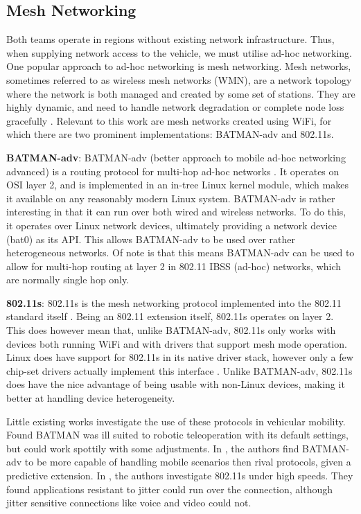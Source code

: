 \documentclass[journal]{IEEEtran}
\begin{document}
\subsection{Mesh Networking}
Both teams operate in regions without existing network infrastructure. Thus, when supplying network access to the vehicle, we must utilise ad-hoc networking. One popular approach to ad-hoc networking is mesh networking.
Mesh networks, sometimes referred to as wireless mesh networks (WMN), are a network topology where the network is both managed and created by some set of stations. They are
highly dynamic, and need to handle network degradation or complete node loss gracefully \cite{1509968}. Relevant to this work are mesh networks created using WiFi, for
which there are two prominent implementations: BATMAN-adv and 802.11s.

\textbf{BATMAN-adv}: BATMAN-adv (better approach to mobile ad-hoc networking advanced) is a routing protocol for multi-hop ad-hoc networks \cite{open}. It operates on
OSI layer 2, and is implemented in an in-tree Linux kernel module, which makes it available on any reasonably modern Linux system. BATMAN-adv is rather interesting in that it can run over both wired and wireless networks. To do this, it operates over 
Linux network devices, ultimately providing a network device (bat0) as its API. This allows BATMAN-adv to be used over rather heterogeneous networks. Of note is that this means BATMAN-adv can be used to allow for multi-hop routing at layer 2 in 802.11 IBSS (ad-hoc) networks, which are normally single hop only.

\textbf{802.11s}: 802.11s is the mesh networking protocol implemented into the 802.11 standard itself \cite{article}. Being an 802.11 extension itself, 802.11s operates on layer 2. This does however mean that, unlike BATMAN-adv, 802.11s only works with devices both running WiFi and with drivers that support mesh mode operation. Linux does have support for 802.11s in its native driver stack, however only a few chip-set drivers actually implement this interface \cite{en:developers:documentation:ieee80211:802.11s}. Unlike BATMAN-adv, 802.11s does have the nice advantage of being usable with non-Linux devices, making it better at handling device heterogeneity.

Little existing works investigate the use of these protocols in vehicular mobility. \cite{zeiger2009mobile} Found BATMAN was ill suited to robotic teleoperation with its default settings, but could work spottily with some adjustments. In \cite{8746361}, the authors find BATMAN-adv to be more capable of handling mobile scenarios then rival protocols, given a predictive extension. In \cite{8417706}, the authors investigate 802.11s under high speeds. They found applications resistant to jitter could run over the connection, although jitter sensitive connections like voice and video could not.
\end{document}
